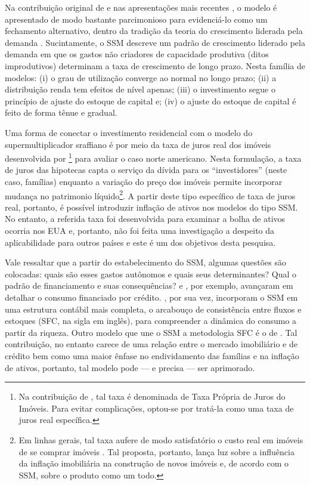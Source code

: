 Na contribuição original de \textcite{serrano_sraffian_1995} e nas apresentações mais recentes \cite{freitas_growth_2015}, o modelo é apresentado de modo bastante parcimonioso para evidenciá-lo como um fechamento alternativo, dentro da tradição da teoria do crescimento liderada pela demanda \cite{serrano_sraffian_2017}. 
Sucintamente, o SSM descreve um padrão de crescimento liderado pela demanda em que os gastos não criadores de capacidade produtiva (ditos improdutivos) determinam a taxa de crescimento de longo prazo. 
Nesta família de modelos: 
	(i) o grau de utilização converge ao normal no longo prazo; 
	(ii) a distribuição renda tem efeitos de nível apenas; 
	(iii) o investimento segue o princípio de ajuste do estoque de capital e;
	(iv) o ajuste do estoque de capital é feito de forma tênue e gradual. 
	
Uma forma de conectar o investimento residencial com o modelo do supermultiplicador sraffiano é por meio da taxa de juros real dos imóveis desenvolvida por \textcite{teixeira_crescimento_2015}\footnote{Na contribuição de \textcite{teixeira_crescimento_2015}, tal taxa é denominada de Taxa Própria de Juros do Imóveis. Para evitar complicações, optou-se por tratá-la como uma taxa de juros real específica.} para avaliar o caso norte americano. Nesta formulação, a taxa de juros das hipotecas capta o serviço da dívida para os ``investidores'' (neste caso, famílias) enquanto a variação do preço dos imóveis permite incorporar mudança no patrimonio líquido\footnote{Em linhas gerais, tal taxa aufere de modo satisfatório o custo real em imóveis de se comprar imóveis \cite[p.~53]{teixeira_crescimento_2015}. Tal proposta, portanto, lança luz sobre a influência da inflação imobiliária na construção de novos imóveis e, de acordo com o SSM, sobre o produto como um todo.}. 
A partir deste tipo específico de taxa de juros real, portanto, é possível introduzir inflação de ativos nos modelos do tipo SSM. No entanto, a referida taxa foi desenvolvida para examinar a bolha de ativos ocorria nos EUA e, portanto, não foi feita uma investigação a despeito da aplicabilidade para outros países e este é um dos objetivos desta pesquisa.

	
Vale ressaltar que a partir do estabelecimento do SSM, algumas questões são colocadas: quais são esses gastos autônomos e quais seus determinantes? Qual o padrão de financiamento e suas consequências? \textcite{pariboni_household_2016} e \textcite{fagundes_dinamica_2017}, por exemplo, avançaram em detalhar o consumo financiado por crédito.  \textcite{brochier_supermultiplier_2018}, por sua vez, incorporam o SSM em uma estrutura contábil mais completa, o arcabouço de consistência entre fluxos e estoques (SFC, na sigla em inglês), para compreender a dinâmica do consumo a partir da riqueza. Outro modelo que une o SSM a metodologia SFC é o de \textcite{da_silveira_investimento_2019}. Tal contribuição, no entanto carece de uma relação entre o mercado imobiliário e de crédito bem como uma maior ênfase no endividamento das famílias e na inflação de ativos, portanto, tal modelo pode --- e precisa --- ser  aprimorado.


